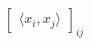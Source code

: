 \documentclass[preview]{standalone}
\begin{document}
\begin{align*}
\begin{bmatrix}\langle x_i , x_j\rangle\end{bmatrix}_{ij}
\end{align*}
\end{document}
